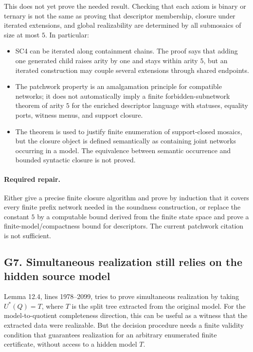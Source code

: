 \documentclass[11pt]{article}
\begin{document}
This does not yet prove the needed result.  Checking that each axiom is binary
or ternary is not the same as proving that descriptor membership, closure under
iterated extensions, and global realizability are determined by all submosaics
of size at most \(5\).  In particular:
\begin{itemize}
\item SC4 can be iterated along containment chains.  The proof says that adding
one generated child raises arity by one and stays within arity \(5\), but an
iterated construction may couple several extensions through shared endpoints.
\item The patchwork property is an amalgamation principle for compatible
networks; it does not automatically imply a finite forbidden-subnetwork theorem
of arity \(5\) for the enriched descriptor language with statuses, equality
ports, witness menus, and support closure.
\item The theorem is used to justify finite enumeration of support-closed
mosaics, but the closure object is defined semantically as containing joint
networks occurring in a model.  The equivalence between semantic occurrence and
bounded syntactic closure is not proved.
\end{itemize}

\paragraph{Required repair.}
Either give a precise finite closure algorithm and prove by induction that it
covers every finite prefix network needed in the soundness construction, or
replace the constant \(5\) by a computable bound derived from the finite state
space and prove a finite-model/compactness bound for descriptors.  The current
patchwork citation is not sufficient.

\subsection{G7. Simultaneous realization still relies on the hidden source model}

Lemma 12.4, lines 1978--2099, tries to prove simultaneous realization by taking
\(U^\ast(Q)=T\), where \(T\) is the split tree extracted from the original model.
For the model-to-quotient completeness direction, this can be useful as a
witness that the extracted data were realizable.  But the decision procedure
needs a finite validity condition that guarantees realization for an arbitrary
enumerated finite certificate, without access to a hidden model \(T\).
\end{document}

